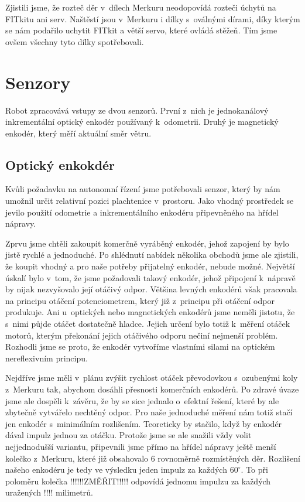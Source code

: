 Zjistili jsme, že rozteč děr v~dílech Merkuru neodopovídá rozteči úchytů na FITkitu ani serv. Naštěstí jsou v~Merkuru i dílky s~oválnými dírami, díky kterým se nám podařilo uchytit FITkit a větší servo, které ovládá stěžeň. Tím jsme ovšem všechny tyto dílky spotřebovali.

\section{Senzory}
Robot zpracovává vstupy ze dvou senzorů. První z~nich je jednokanálový inkrementální optický enkodér používaný k~odometrii. Druhý je magnetický enkodér, který měří aktuální směr větru.

\subsection{Optický enkokdér}
Kvůli požadavku na autonomní řízení jsme potřebovali senzor, který by nám umožnil určit relativní pozici plachtenice v~prostoru. Jako vhodný prostředek se jevilo použití odometrie a inkrementálního enkodéru připevněného na hřídel nápravy.

Zprvu jsme chtěli zakoupit komerčně vyráběný enkodér, jehož zapojení by bylo jistě rychlé a jednoduché. Po shlédnutí nabídek několika obchodů jsme ale zjistili, že koupit vhodný a pro naše potřeby přijatelný enkodér, nebude možné. Největší úskalí bylo v~tom, že jsme požadovali takový enkodér, jehož připojení k~nápravě by nijak nezvyšovalo její otáčivý odpor. Většina levných enkodérů však pracovala na principu otáčení potenciometrem, který již z~principu při otáčení odpor produkuje. Ani u~optických nebo magnetických enkodérů jsme neměli jistotu, že s~nimi půjde otáčet dostatečně hladce. Jejich určení bylo totiž k~měření otáček motorů, kterým překonání jejich otáčivého odporu nečiní nejmenší problém. Rozhodli jsme se proto, že enkodér vytvoříme vlastními silami na optickém nereflexivním principu.

Nejdříve jsme měli v~plánu zvýšit rychlost otáček převodovkou s~ozubenými koly z~Merkuru tak, abychom dosáhli přesnosti komerčních enkodérů. Po zdravé úvaze jsme ale dospěli k~závěru, že by se sice jednalo o~efektní řešení, které by ale zbytečně vytvářelo nechtěný odpor. Pro naše jednoduché měření nám totiž stačí jen enkodér s~minimálním rozlišením. Teoreticky by stačilo, když by enkodér dával impulz jednou za otáčku. Protože jsme se ale snažili vždy volit nejjednodušší variantu, připevnili jsme přímo na hřídel nápravy ještě menší kolečko z~Merkuru, které již obsahovalo 6 rovnoměrně rozmístěných děr. Rozlišení našeho enkodéru je tedy ve výsledku jeden impulz za každých $60^\circ$. To při poloměru kolečka !!!!!!ZMĚŘIT!!!!! odpovídá jednomu impulzu za každých uražených !!!! milimetrů.

